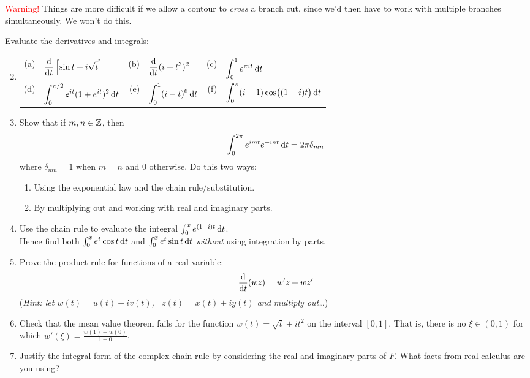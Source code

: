 \textcolor{red}{Warning!} Things are more difficult if we allow a contour to \emph{cross} a branch cut, since we'd then have to work with multiple branches simultaneously. We won't do this.
\goodbreak


\begin{exercises}
	\exstart Evaluate the derivatives and integrals:
	\begin{enumerate}\setcounter{enumi}{1}
	  \item[]\begin{tabular}[t]{r@{\ \ }l@{\qquad}r@{\ \ }l@{\qquad}r@{\ \ }l}
		  (a)&
		  $\displaystyle\frac{\mathrm{d} }{\mathrm{d} t}\left[\sin t+i\sqrt t\right]$&
		  (b)&
		  $\displaystyle\frac{\mathrm{d} }{\mathrm{d} t}(i+t^3)^2$&
		  (c)&
		  $\displaystyle\int_0^1e^{\pi it}\,{\mathrm{d} t}$\\[10pt]
			(d)&
			$\displaystyle\int_0^{\pi/2} e^{it}(1+e^{it})^2\,{\mathrm{d} t}$&
		  (e)&
		  $\displaystyle\int_0^1(i-t)^6\,{\mathrm{d} t}$&
			(f)&
			$\displaystyle\int_0^{\pi} (i-1)\cos\bigl((1+i)t\bigr)\,{\mathrm{d} t}$
	  \end{tabular}
	  
	  
	  \item Show that if $m,n\in\mathbb{Z}$, then
	  \[
	  	\int_0^{2\pi}e^{imt}e^{-int}\,{\mathrm{d} t}=2\pi\delta_{mn}
	  \]
	  where $\delta_{mn}=1$ when $m=n$ and 0 otherwise. Do this two ways:
	  \begin{enumerate}
	    \item Using the exponential law and the chain rule/substitution.
	    \item By multiplying out and working with real and imaginary parts.
	  \end{enumerate}
	  
	  
	  \item Use the chain rule to evaluate the integral $\int_0^xe^{(1+i)t}\,{\mathrm{d} t}$.\\
	  Hence find both $\int_0^xe^t\cos t\,{\mathrm{d} t}$ and $\int_0^xe^t\sin t\,{\mathrm{d} t}$ \emph{without} using integration by parts.
	  
	  
	  \item Prove the product rule for functions of a real variable:
	  \[
	  	\frac{\mathrm{d} }{\mathrm{d} t}(wz)=w'z+wz'
	  \]
	 	(\emph{Hint: let $w(t)=u(t)+iv(t)$, \ $z(t)=x(t)+iy(t)$ and multiply out\ldots})
	  
	  
	  \item Check that the mean value theorem fails for the function $w(t)=\sqrt t+it^2$ on the interval $[0,1]$. That is, there is no $\xi\in(0,1)$ for which $w'(\xi)=\frac{w(1)-w(0)}{1-0}$.
	  
	  
	  \item Justify the integral form of the complex chain rule by considering the real and imaginary parts of $F$. What facts from real calculus are you using?
	  

\end{enumerate}
\end{exercises}
